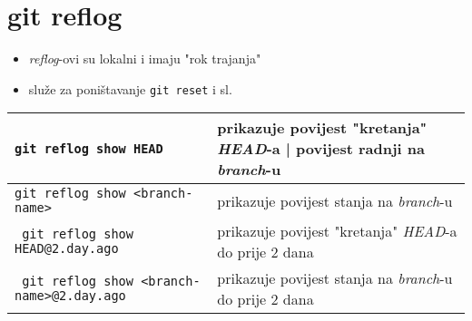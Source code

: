 \documentclass[10pt]{article}
\begin{document}
    \section*{git reflog}
    \begin{itemize}
        \item \textit{reflog}-ovi su lokalni i imaju "rok trajanja"
        \item služe za poništavanje \texttt{git reset} i sl.
    \end{itemize}
    \begin{tabular}{|>{\tt}p{9.00cm}|>{}p{15.50cm}|}
        \hline
        git reflog show HEAD                        & prikazuje povijest "kretanja" \textit{HEAD}-a | povijest radnji na \textit{branch}-u \\ \hline
        git reflog show <branch-name>               & prikazuje povijest stanja na \textit{branch}-u \\ \hline
        git reflog show HEAD@{2.day.ago}            & prikazuje povijest "kretanja" \textit{HEAD}-a do prije 2 dana \\ \hline
        git reflog show <branch-name>@{2.day.ago}   & prikazuje povijest stanja na \textit{branch}-u do prije 2 dana \\ \hline
    \end{tabular}
\end{document}
